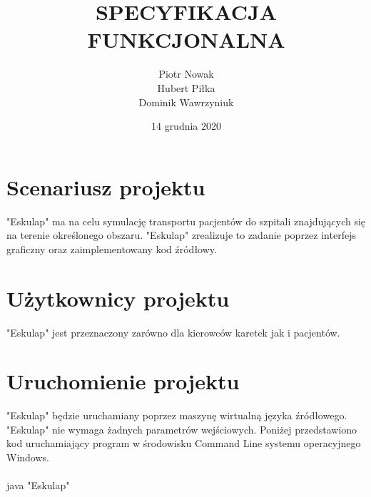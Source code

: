\documentclass[a4paper,12pt,twoside]{article}
\title{SPECYFIKACJA FUNKCJONALNA \\ \nazwa}
\date{14 grudnia 2020}
\author{Piotr Nowak \\Hubert Piłka \\Dominik Wawrzyniuk}
\newcommand\nazwa{"Eskulap" }
\begin{document}
\maketitle
\tableofcontents

\section{Scenariusz projektu}
\nazwa ma na celu symulację transportu pacjentów do szpitali znajdujących się na terenie określonego obszaru. \nazwa zrealizuje to zadanie poprzez interfejs graficzny oraz zaimplementowany kod źródłowy.

\section{Użytkownicy projektu}
\nazwa jest przeznaczony zarówno dla kierowców karetek jak i pacjentów.

\section{Uruchomienie projektu}
\nazwa będzie uruchamiany poprzez maszynę wirtualną języka źródłowego. \nazwa nie wymaga żadnych parametrów wejściowych. Poniżej przedstawiono kod uruchamiający program w środowisku Command Line systemu operacyjnego Windows.

\paragraph{}
java \nazwa
\end{document}
